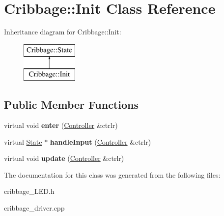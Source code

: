 \hypertarget{class_cribbage_1_1_init}{}\section{Cribbage\+:\+:Init Class Reference}
\label{class_cribbage_1_1_init}
Inheritance diagram for Cribbage\+:\+:Init\+:\begin{figure}[H]
\begin{center}
\leavevmode
\includegraphics[height=2.000000cm]{class_cribbage_1_1_init}
\end{center}
\end{figure}
\subsection*{Public Member Functions}
\begin{DoxyCompactItemize}
\item 
\mbox{\label{class_cribbage_1_1_init_a234031d7860e02d505e010b9da688c6b}} 
virtual void {\bfseries enter} (\hyperlink{class_cribbage_1_1_controller}{Controller} \&ctrlr)
\item 
\mbox{\label{class_cribbage_1_1_init_a23186fd972961293af8d014025124f1a}} 
virtual \hyperlink{class_cribbage_1_1_state}{State} $\ast$ {\bfseries handle\+Input} (\hyperlink{class_cribbage_1_1_controller}{Controller} \&ctrlr)
\item 
\mbox{\label{class_cribbage_1_1_init_aafe4990ebf1434c495ffb7eebbf3e4e6}} 
virtual void {\bfseries update} (\hyperlink{class_cribbage_1_1_controller}{Controller} \&ctrlr)
\end{DoxyCompactItemize}


The documentation for this class was generated from the following files\+:\begin{DoxyCompactItemize}
\item 
cribbage\+\_\+\+L\+E\+D.\+h\item 
cribbage\+\_\+driver.\+cpp\end{DoxyCompactItemize}
